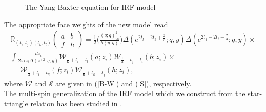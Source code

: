 \documentclass[a4paper,11pt]{article}%
\numberwithin{equation}{section}
\begin{document}
\begin{figure}[H]
\caption{The Yang-Baxter equation for IRF model}
\label{IRF YBE}
 \end{figure}
 The appropriate face weights of the new model read 
\begin{align}\label{sirf}
    \mathbb{R}_{(t_i,t_j)(t_k,t_l)}\left( \begin{array}{cc} {a} & {}{b}\\{f}&{}{h} \end{array}\right) = \nonumber \frac{1}{2}\Big(\frac{(q;q)^2_{\infty}}{\theta(y;q)}\Big) \Delta(e^{2t_l-2t_k+\frac{2}{3}};q,y)\Delta(e^{2t_j-2t_i+\frac{2}{3}};q,y) \times\\ \nonumber
     \int \frac{dz_i}{2\pi i z_i \Delta(z^{\pm2};q,y)} \mathcal{W}_{\frac{1}{6}+t_i-t_l}(a;z_i)  \mathcal{W}_{\frac{1}{3}+t_j-t_i}(b;z_i) \times\\ \,\,\,\,\,\,\,\,\mathcal{W}_{\frac{1}{3}+t_l-t_k}(f;z_i)\mathcal{W}_{\frac{1}{6}+t_k-t_j}(h;z_i),
       \end{align}
where $\mathcal{W}$ and $\mathcal{S}$ are given in (\ref{B-W}) and (\ref{S}), respectively.\\
The  multi-spin  generalization of the IRF model which we  construct from the star-triangle relation has been studied in \cite{Yamazaki:2015voa}.



\end{document}
